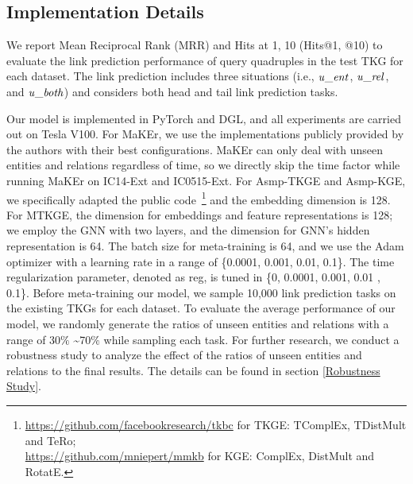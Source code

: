 \documentclass[sigconf]{acmart}
\begin{document}
\subsection{Implementation Details } 
\par
We report Mean Reciprocal Rank (MRR) and Hits at 1, 10 (Hits@1, @10) to evaluate the link prediction performance of query quadruples in the test TKG for each dataset. The link prediction includes three situations (i.e., $\text {\emph{u}\_\emph{ent}}$, $\text {\emph{u}\_\emph{rel}}$, and $\text {\emph{u}\_\emph{both}}$) and considers both head and tail link prediction tasks. 
\par
Our model is implemented in PyTorch and DGL, and all experiments are carried out on Tesla V100. 
For MaKEr, we use the implementations publicly provided by the authors with their best configurations. MaKEr can only deal with unseen entities and relations regardless of time, so we directly skip the time factor while running MaKEr on IC14-Ext and IC0515-Ext. For Asmp-TKGE and Asmp-KGE, we specifically adapted the public code\!~\footnote{\url{https://github.com/facebookresearch/tkbc} for TKGE: TComplEx, TDistMult and TeRo;\\ \url{https://github.com/mniepert/mmkb} for KGE: ComplEx, DistMult and RotatE.} and the embedding dimension is 128. For MTKGE, the dimension for embeddings and feature representations is 128; we employ the GNN with two layers, and the dimension for GNN’s hidden representation is 64. The batch size for meta-training is 64, and we use the Adam optimizer with a learning rate in a range of \{0.0001, 0.001, 0.01, 0.1\}. The time regularization parameter, denoted as reg, is tuned in \{0, 0.0001, 0.001, 0.01 , 0.1\}. Before meta-training our model, we sample 10,000 link prediction tasks on the existing TKGs for each dataset. To evaluate the average performance of our model, we randomly generate the ratios of unseen entities and relations with a range of 30$\%$ \textasciitilde 70$\%$ while sampling each task. For further research, we conduct a robustness study to analyze the effect of the ratios of unseen entities and relations to the final results. The details can be found in section \ref{Robustness Study}.

\end{document}
